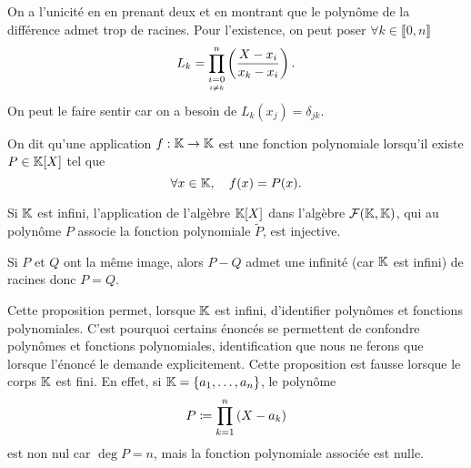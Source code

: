 \documentclass{magnolia}
\begin{document}

\begin{preuve}
On a l'unicité en en prenant deux et en montrant que le polynôme de la différence admet trop de racines. 
  Pour l'existence, on peut poser $\forall k \in \llbracket 0,n \rrbracket$ $$L_k=\prod_{\underset{i\neq k}{i=0}}^n\left(\frac{X-x_i}{x_k-x_i}\right).$$
  On peut le faire sentir car on a besoin de $L_k(x_j)=\delta_{jk}$.
  \end{preuve}



\begin{definition}
On dit qu'une application $f:\mathbb{K}\to\mathbb{K}$ est une fonction polynomiale lorsqu'il existe
$P\in\polyK$ tel que
\[\forall x\in\mathbb{K} ,\quad f(x)=P(x).\]
\end{definition}

\begin{proposition}
Si $\mathbb{K}$ est infini,
l'application de l'algèbre $\polyK$ dans l'algèbre $\mathcal{F}(\mathbb{K},\mathbb{K})$, qui au polynôme $P$ associe la fonction polynomiale
$\tilde{P}$, est injective.  
\end{proposition}

\begin{preuve}
Si $P$ et $Q$ ont la même image, alors $P-Q$ admet une infinité (car $\mathbb{K}$ est infini) de racines donc $P=Q$.
\end{preuve} 

\begin{remarques}
\remarque Cette proposition permet, lorsque $\mathbb{K}$ est infini, d'identifier polynômes et
  fonctions polynomiales. C'est pourquoi certains énoncés se
  permettent de confondre polynômes et fonctions polynomiales, identification
  que nous ne ferons que lorsque l'énoncé le demande explicitement.
\remarque Cette proposition est fausse lorsque le corps $\mathbb{K}$ est fini. En effet,
  si $\mathbb{K}=\left\{a_1,\ldots,a_n\right\}$, le polynôme
  \[P\coloneqq\prod_{k=1}^n \left(X-a_k\right)\]
  est non nul car $\deg P=n$, mais la fonction polynomiale associée est nulle.
\end{remarques}
\end{document}
